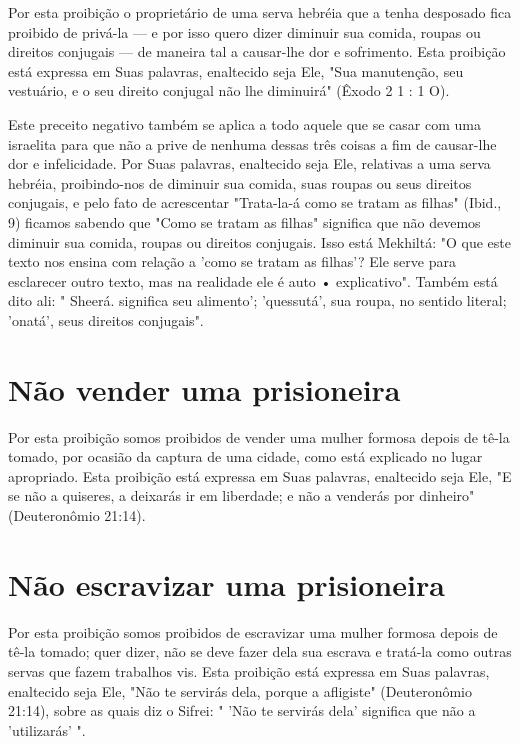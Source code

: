 \begin{itemize}
\begin{enumrate}
\begin{itemize}
\begin{itemize}
\begin{itemize}
Por esta proibição o proprietário de uma serva hebréia que a tenha
desposado fica proibido de privá-la --- e por isso quero dizer diminuir
sua co­mida, roupas ou direitos conjugais --- de maneira tal a
causar-lhe dor e sofri­mento. Esta proibição está expressa em Suas
palavras, enaltecido seja Ele, "Sua manutenção, seu vestuário, e o seu
direito conjugal não lhe diminuirá" (Êxodo 2 1 : 1 O).

Este preceito negativo também se aplica a todo aquele que se casar com
uma israelita para que não a prive de nenhuma dessas três coisas a fim
de causar-lhe dor e infelicidade. Por Suas palavras, enaltecido seja Ele,
relativas a uma serva hebréia, proibindo-nos de diminuir sua comida,
suas roupas ou seus direitos conjugais, e pelo fato de acrescentar
"Trata-la-á como se tratam as fi­lhas" (Ibid., 9) ficamos sabendo que
"Como se tratam as filhas" significa que não devemos diminuir sua
comida, roupas ou direitos conjugais. Isso está
Mekhiltá: "O que este
texto nos ensina com relação a 'como se tra­tam as filhas'? Ele serve
para esclarecer outro texto, mas na realidade ele é auto • explicativo".
Também está dito ali: " Sheerá. significa seu
alimento'; 'quessu­tá', sua roupa, no sentido literal; 'onatá', seus
direitos conjugais".

\section{Não vender uma prisioneira}

Por esta proibição somos proibidos de vender uma mulher formosa depois
de tê-la tomado, por ocasião da captura de uma cidade, como está
expli­cado no lugar apropriado. Esta proibição está expressa em Suas
palavras, enal­tecido seja Ele, "E se não a quiseres, a deixarás ir em
liberdade; e não a vende­rás por dinheiro" (Deuteronômio 21:14).


\section{Não escravizar uma prisioneira}


Por esta proibição somos proibidos de escravizar uma mulher for­mosa
depois de tê-la tomado; quer dizer, não se deve fazer dela sua escrava e
tratá-la como outras servas que fazem trabalhos vis. Esta proibição está
ex­pressa em Suas palavras, enaltecido seja Ele, "Não te servirás dela,
porque a afligiste" (Deuteronômio 21:14), sobre as quais diz o Sifrei: "
'Não te servirás dela' significa que não a 'utilizarás' ".


\end{itemize}
\end{itemize}
\end{itemize}
\end{enumrate}
\end{itemize}
